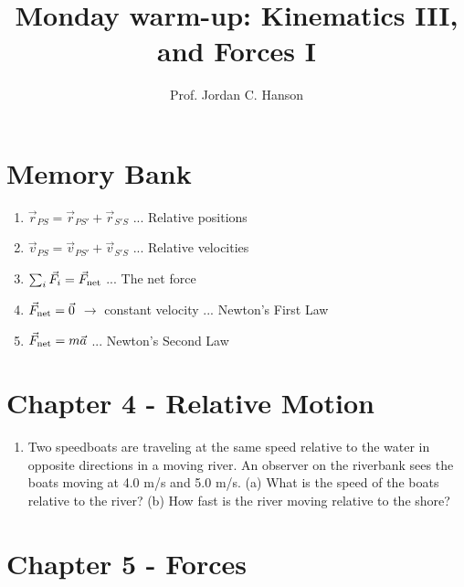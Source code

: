 \documentclass{article}
\begin{document}
\twocolumn

\title{Monday warm-up: Kinematics III, and Forces I}
\author{Prof. Jordan C. Hanson}

\maketitle

\section{Memory Bank}

\begin{enumerate}
\item $\vec{r}_{PS} = \vec{r}_{PS'}+\vec{r}_{S'S}$ ... Relative positions
\item $\vec{v}_{PS} = \vec{v}_{PS'}+\vec{v}_{S'S}$ ... Relative velocities
\item $\sum_i \vec{F}_i = \vec{F}_{\rm net}$ ... The net force
\item $\vec{F}_{\rm net} = \vec{0}$ $\to$ constant velocity ... Newton's First Law
\item $\vec{F}_{\rm net} = m\vec{a}$ ... Newton's Second Law
\end{enumerate}

\section{Chapter 4 - Relative Motion}

\begin{enumerate}
\item Two speedboats are traveling at the same speed relative to the water in opposite directions in a moving river. An observer on the riverbank sees the boats moving at 4.0 m/s and 5.0 m/s. (a) What is the speed of the boats relative to the river? (b) How fast is the river moving relative to the shore? \\ \vspace{3cm}
\end{enumerate}

\section{Chapter 5 - Forces}
\end{document}
